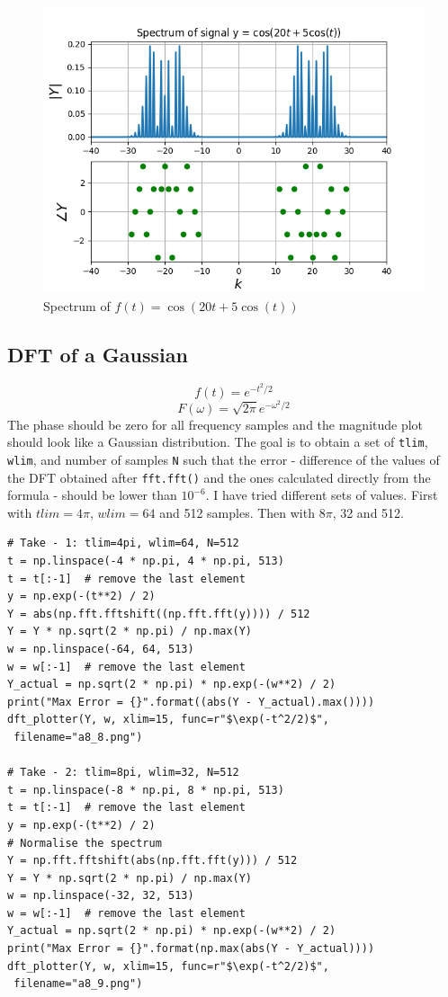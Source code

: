 \documentclass[11pt, a4paper]{article}
\begin{document}
\begin{figure}[!tbh]
   	\centering
  \includegraphics[scale=0.5]{a8_7.png} 
    \caption{Spectrum of $f(t)=\cos(20t+5\cos(t))$} 	
   \end{figure} 
   
\subsection{DFT of a Gaussian}
$$f(t)=e^{-t^2/2}$$
$$F(\omega)=\sqrt{2\pi}e^{-\omega^2/2} $$
The phase should be zero for all frequency samples and the magnitude plot should look like a Gaussian distribution. The goal is to obtain a set of \texttt{tlim}, \texttt{wlim}, and number of samples \texttt{N} such that the error - difference of the values of the DFT obtained after \texttt{fft.fft()} and the ones calculated directly from the formula - should be lower than $10^{-6}$.  I have tried different sets of values. First with $tlim = 4\pi$, $wlim=64$ and 512 samples. Then with $8\pi$, 32 and 512. 
\begin{verbatim}
# Take - 1: tlim=4pi, wlim=64, N=512
t = np.linspace(-4 * np.pi, 4 * np.pi, 513)
t = t[:-1]  # remove the last element
y = np.exp(-(t**2) / 2)
Y = abs(np.fft.fftshift((np.fft.fft(y)))) / 512
Y = Y * np.sqrt(2 * np.pi) / np.max(Y)
w = np.linspace(-64, 64, 513)
w = w[:-1]  # remove the last element
Y_actual = np.sqrt(2 * np.pi) * np.exp(-(w**2) / 2)
print("Max Error = {}".format((abs(Y - Y_actual).max())))
dft_plotter(Y, w, xlim=15, func=r"$\exp(-t^2/2)$",
 filename="a8_8.png")

# Take - 2: tlim=8pi, wlim=32, N=512
t = np.linspace(-8 * np.pi, 8 * np.pi, 513)
t = t[:-1]  # remove the last element
y = np.exp(-(t**2) / 2)
# Normalise the spectrum
Y = np.fft.fftshift(abs(np.fft.fft(y))) / 512
Y = Y * np.sqrt(2 * np.pi) / np.max(Y)
w = np.linspace(-32, 32, 513)
w = w[:-1]  # remove the last element
Y_actual = np.sqrt(2 * np.pi) * np.exp(-(w**2) / 2)
print("Max Error = {}".format(np.max(abs(Y - Y_actual))))
dft_plotter(Y, w, xlim=15, func=r"$\exp(-t^2/2)$",
 filename="a8_9.png")
\end{verbatim}
\end{document}
